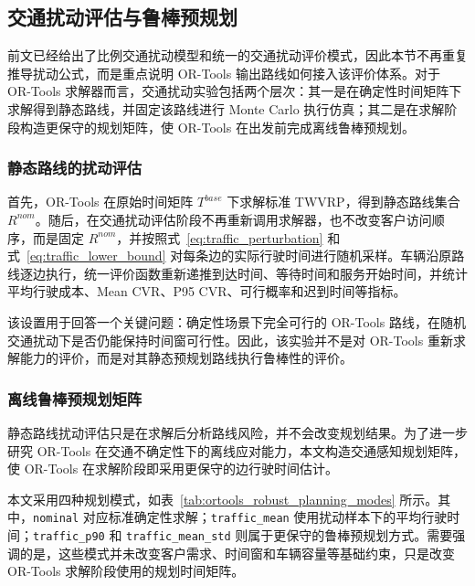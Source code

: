 \documentclass[12pt,a4paper,UTF8]{article}
\begin{document}
\subsection{交通扰动评估与鲁棒预规划}

前文已经给出了比例交通扰动模型和统一的交通扰动评价模式，因此本节不再重复推导扰动公式，而是重点说明 OR-Tools 输出路线如何接入该评价体系。对于 OR-Tools 求解器而言，交通扰动实验包括两个层次：其一是在确定性时间矩阵下求解得到静态路线，并固定该路线进行 Monte Carlo 执行仿真；其二是在求解阶段构造更保守的规划矩阵，使 OR-Tools 在出发前完成离线鲁棒预规划。

\subsubsection{静态路线的扰动评估}

首先，OR-Tools 在原始时间矩阵 $T^{base}$ 下求解标准 TWVRP，得到静态路线集合 $R^{nom}$。随后，在交通扰动评估阶段不再重新调用求解器，也不改变客户访问顺序，而是固定 $R^{nom}$，并按照式~\eqref{eq:traffic_perturbation} 和式~\eqref{eq:traffic_lower_bound} 对每条边的实际行驶时间进行随机采样。车辆沿原路线逐边执行，统一评价函数重新递推到达时间、等待时间和服务开始时间，并统计平均行驶成本、Mean CVR、P95 CVR、可行概率和迟到时间等指标。

该设置用于回答一个关键问题：确定性场景下完全可行的 OR-Tools 路线，在随机交通扰动下是否仍能保持时间窗可行性。因此，该实验并不是对 OR-Tools 重新求解能力的评价，而是对其静态预规划路线执行鲁棒性的评价。

\subsubsection{离线鲁棒预规划矩阵}

静态路线扰动评估只是在求解后分析路线风险，并不会改变规划结果。为了进一步研究 OR-Tools 在交通不确定性下的离线应对能力，本文构造交通感知规划矩阵，使 OR-Tools 在求解阶段即采用更保守的边行驶时间估计。

本文采用四种规划模式，如表~\ref{tab:ortools_robust_planning_modes} 所示。其中，\texttt{nominal} 对应标准确定性求解；\texttt{traffic\_mean} 使用扰动样本下的平均行驶时间；\texttt{traffic\_p90} 和 \texttt{traffic\_mean\_std} 则属于更保守的鲁棒预规划方式。需要强调的是，这些模式并未改变客户需求、时间窗和车辆容量等基础约束，只是改变 OR-Tools 求解阶段使用的规划时间矩阵。
\end{document}
